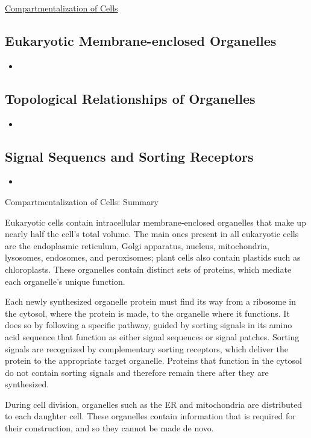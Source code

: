 \documentclass[12pt,letterpaper]{article}
\begin{document}
\hypertarget{12.1}{}
\begin{secbox}{\hyperlink{12}{Compartmentalization of Cells}}{
    \hypertarget{12.1.1}{\subsection*{Eukaryotic Membrane-enclosed Organelles}}
    \begin{itemize}
        \item
    \end{itemize}

    \hypertarget{12.1.2}{\subsection*{Topological Relationships of Organelles}}
    \begin{itemize}
        \item
    \end{itemize}

    \hypertarget{12.1.3}{\subsection*{Signal Sequencs and Sorting Receptors}}
    \begin{itemize}
        \item
    \end{itemize}

    \hypertarget{12.1.r}{}

    \begin{probbox}{Compartmentalization of Cells: Summary}\end{probbox}
        Eukaryotic cells contain intracellular membrane-enclosed organelles that make up nearly half the cell’s total volume. The main ones present in all eukaryotic cells are the endoplasmic reticulum, Golgi apparatus, nucleus, mitochondria, lysosomes, endosomes, and peroxisomes; plant cells also contain plastids such as chloroplasts. These organelles contain distinct sets of proteins, which mediate each organelle’s unique function.\par 
        \vspace{10 pt}
        Each newly synthesized organelle protein must find its way from a ribosome in the cytosol, where the protein is made, to the organelle where it functions. It does so by following a specific pathway, guided by sorting signals in its amino acid sequence that function as either signal sequences or signal patches. Sorting signals are recognized by complementary sorting receptors, which deliver the protein to the appropriate target organelle. Proteins that function in the cytosol do not contain sorting signals and therefore remain there after they are synthesized.\par
        \vspace{10pt}
        During cell division, organelles such as the ER and mitochondria are distributed to each daughter cell. These organelles contain information that is required for their construction, and so they cannot be made de novo.
}\end{secbox}
\end{document}
